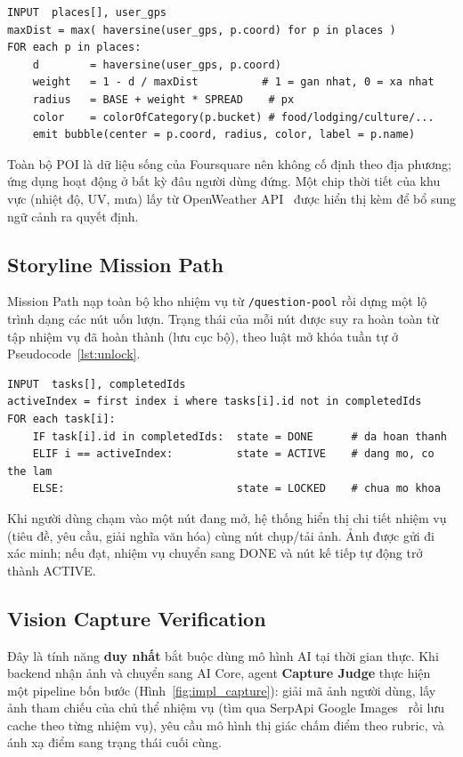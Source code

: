 \begin{lstlisting}[caption={Dựng bong bóng theo khoảng cách tới người dùng}, label={lst:bubble}]
INPUT  places[], user_gps
maxDist = max( haversine(user_gps, p.coord) for p in places )
FOR each p in places:
    d        = haversine(user_gps, p.coord)
    weight   = 1 - d / maxDist          # 1 = gan nhat, 0 = xa nhat
    radius   = BASE + weight * SPREAD    # px
    color    = colorOfCategory(p.bucket) # food/lodging/culture/...
    emit bubble(center = p.coord, radius, color, label = p.name)
\end{lstlisting}

Toàn bộ POI là dữ liệu sống của Foursquare nên không cố định theo địa
phương; ứng dụng hoạt động ở bất kỳ đâu người dùng đứng. Một chip thời
tiết của khu vực (nhiệt độ, UV, mưa) lấy từ OpenWeather
API~\cite{openweather_api} được hiển thị kèm để bổ sung ngữ cảnh ra
quyết định.

\subsection{Storyline Mission Path}
\contrib

Mission Path nạp toàn bộ kho nhiệm vụ từ \texttt{/question-pool} rồi dựng
một lộ trình dạng các nút uốn lượn. Trạng thái của mỗi nút được suy ra
hoàn toàn từ tập nhiệm vụ đã hoàn thành (lưu cục bộ), theo luật mở khóa
tuần tự ở Pseudocode~\ref{lst:unlock}.

\begin{lstlisting}[caption={Luật trạng thái nút trên Mission Path}, label={lst:unlock}]
INPUT  tasks[], completedIds
activeIndex = first index i where tasks[i].id not in completedIds
FOR each task[i]:
    IF task[i].id in completedIds:  state = DONE      # da hoan thanh
    ELIF i == activeIndex:          state = ACTIVE    # dang mo, co the lam
    ELSE:                           state = LOCKED    # chua mo khoa
\end{lstlisting}

Khi người dùng chạm vào một nút đang mở, hệ thống hiển thị chi tiết nhiệm
vụ (tiêu đề, yêu cầu, giải nghĩa văn hóa) cùng nút chụp/tải ảnh. Ảnh được
gửi đi xác minh; nếu đạt, nhiệm vụ chuyển sang DONE và nút kế tiếp tự
động trở thành ACTIVE.

\subsection{Vision Capture Verification}
\contrib

Đây là tính năng \textbf{duy nhất} bắt buộc dùng mô hình AI tại thời gian
thực. Khi backend nhận ảnh và chuyển sang AI Core, agent \textbf{Capture
Judge} thực hiện một pipeline bốn bước
(Hình~\ref{fig:impl_capture}): giải mã ảnh người dùng, lấy ảnh tham chiếu
của chủ thể nhiệm vụ (tìm qua SerpApi Google Images~\cite{serpapi} rồi
lưu cache theo từng nhiệm vụ), yêu cầu mô hình thị giác chấm điểm theo
rubric, và ánh xạ điểm sang trạng thái cuối cùng.


